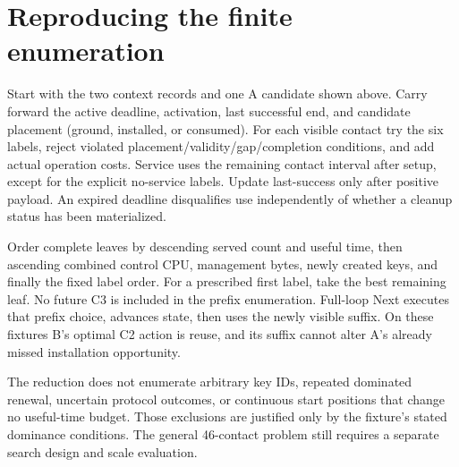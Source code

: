 \documentclass[11pt,a4paper]{article}
\begin{document}
\appendix
\section{Reproducing the finite enumeration}
Start with the two context records and one A candidate shown above. Carry forward the active deadline, activation, last successful end, and candidate placement (ground, installed, or consumed). For each visible contact try the six labels, reject violated placement/validity/gap/completion conditions, and add actual operation costs. Service uses the remaining contact interval after setup, except for the explicit no-service labels. Update last-success only after positive payload. An expired deadline disqualifies use independently of whether a cleanup status has been materialized.

Order complete leaves by descending served count and useful time, then ascending combined control CPU, management bytes, newly created keys, and finally the fixed label order. For a prescribed first label, take the best remaining leaf. No future C3 is included in the prefix enumeration. Full-loop Next executes that prefix choice, advances state, then uses the newly visible suffix. On these fixtures B's optimal C2 action is reuse, and its suffix cannot alter A's already missed installation opportunity.

The reduction does not enumerate arbitrary key IDs, repeated dominated renewal, uncertain protocol outcomes, or continuous start positions that change no useful-time budget. Those exclusions are justified only by the fixture's stated dominance conditions. The general 46-contact problem still requires a separate search design and scale evaluation.
\end{document}
